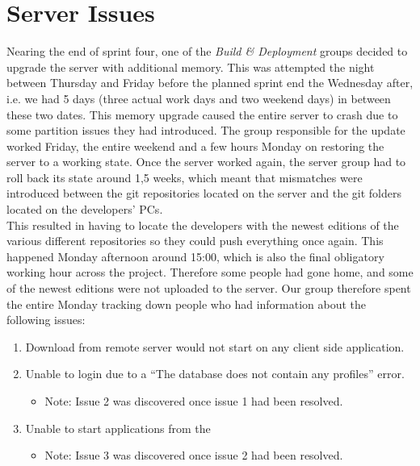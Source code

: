 
\section{Server Issues} 
\label{sec:server_issues}

Nearing the end of sprint four, one of the \emph{Build \& Deployment} groups decided to upgrade the server with additional memory. This was attempted the night between Thursday and Friday before the planned sprint end the Wednesday after, i.e. we had 5 days (three actual work days and two weekend days) in between these two dates. This memory upgrade caused the entire server to crash due to some partition issues they had introduced. The group responsible for the update worked Friday, the entire weekend and a few hours Monday on restoring the server to a working state. Once the server worked again, the server group had to roll back its state around 1,5 weeks, which meant that mismatches were introduced between the git repositories located on the server and the git folders located on the developers' PCs. \\

This resulted in having to locate the developers with the newest editions of the various different repositories so they could push everything once again. This happened Monday afternoon around 15:00, which is also the final obligatory working hour across the project. Therefore some people had gone home, and some of the newest editions were not uploaded to the server. Our group therefore spent the entire Monday tracking down people who had information about the following issues: \\

\begin{enumerate}
    \item Download from remote server would not start on any client side application.
    \item Unable to login due to a ``The database does not contain any profiles'' error.
    \begin{itemize}
        \item Note: Issue 2 was discovered once issue 1 had been resolved.
    \end{itemize}
    \item Unable to start applications from the \launcher   
    \begin{itemize}
        \item Note: Issue 3 was discovered once issue 2 had been resolved. 
    \end{itemize}
\end{enumerate}

